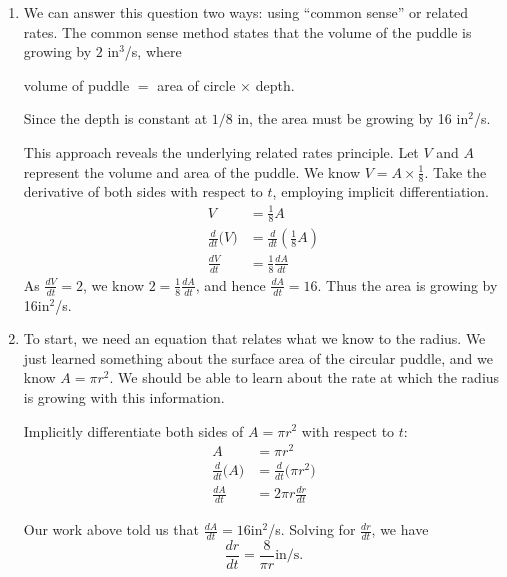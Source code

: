 {\begin{enumerate}
\item We can answer this question two ways: using ``common sense'' or related rates. The common sense method states that the volume of the puddle is growing by $2$ in$^3$/s, where 
	\begin{center} volume of puddle $=$ area of circle $\times$ depth.\end{center}
Since the depth is constant at $1/8$ in, the area must be growing by 16 in$^2$/s.

This approach reveals the underlying related rates principle. Let $V$ and $A$ represent the volume and area of the puddle. We know $V= A\times \frac18$. Take the derivative of both sides with respect to $t$, employing implicit differentiation.
\begin{align*}
V &= \frac18A\\
\frac{d}{dt}\big(V\big) &= \frac{d}{dt}\left(\frac18A\right)\\
\frac{dV}{dt} &=	\frac18\frac{dA}{dt}
\end{align*} 
As $\frac{dV}{dt} = 2$, we know $2 = \frac18\frac{dA}{dt}$, and hence $\frac{dA}{dt} = 16$. Thus the area is growing by 16in$^2$/s.

\drawexampleline
\item		To start, we need an equation that relates what we know to the radius. We just learned something about the surface area of the circular puddle, and we know $A = \pi r^2$. We should be able to learn about the rate at which the radius is growing with this information. 

Implicitly differentiate both sides of $A=\pi r^2$ with respect to $t$:
\begin{align*}
	A 	&= \pi r^2 \\
	\frac{d}{dt}\big(A\big) &= \frac{d}{dt}\big(\pi r^2\big)\\
	\frac{dA}{dt} &= 2\pi r\frac{dr}{dt}
\end{align*}

Our work above told us that $\frac{dA}{dt} = 16 $in$^2$/s. Solving for $\frac{dr}{dt}$, we have $$\frac{dr}{dt} = \frac{8}{\pi r} \text{in/s.}$$


\end{enumerate}}
